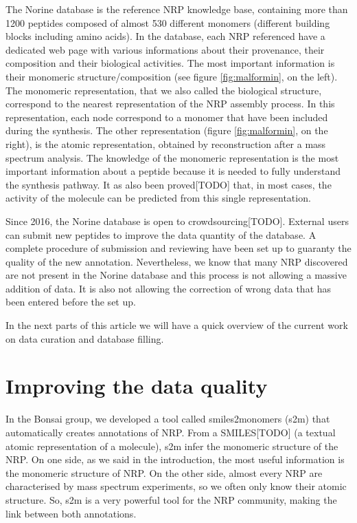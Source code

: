 \documentclass[long, final]{jobim2017}
\begin{document}
The Norine database is the reference NRP knowledge base, containing more than 1200 peptides composed of almost 530 different monomers (different building blocks including amino acids).
In the database, each NRP referenced have a dedicated web page with various informations about their provenance, their composition and their biological activities.
The most important information is their monomeric structure/composition (see figure \ref{fig:malformin}, on the left).
The monomeric representation, that we also called the biological structure, correspond to the nearest representation of the NRP assembly process.
In this representation, each node correspond to a monomer that have been included during the synthesis.
The other representation (figure \ref{fig:malformin}, on the right), is the atomic representation, obtained by reconstruction after a mass spectrum analysis.
The knowledge of the monomeric representation is the most important information about a peptide because it is needed to fully understand the synthesis pathway.
It as also been proved[TODO] that, in most cases, the activity of the molecule can be predicted from this single representation.

Since 2016, the Norine database is open to crowdsourcing[TODO].
External users can submit new peptides to improve the data quantity of the database.
A complete procedure of submission and reviewing have been set up to guaranty the quality of the new annotation.
Nevertheless, we know that many NRP discovered are not present in the Norine database and this process is not allowing a massive addition of data.
It is also not allowing the correction of wrong data that has been entered before the set up.

In the next parts of this article we will have a quick overview of the current work on data curation and database filling.


\section{Improving the data quality}

In the Bonsai group, we developed a tool called smiles2monomers (s2m) that automatically creates annotations of NRP.
From a SMILES[TODO] (a textual atomic representation of a molecule), s2m infer the monomeric structure of the NRP.
On one side, as we said in the introduction, the most useful information is the monomeric structure of NRP.
On the other side, almost every NRP are characterised by mass spectrum experiments, so we often only know their atomic structure.
So, s2m is a very powerful tool for the NRP community, making the link between both annotations.
\end{document}
